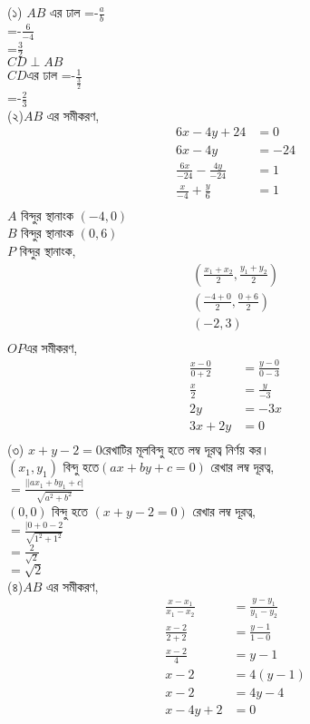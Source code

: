 \documentclass{article}
\begin{document}
	\Large
	(১) $AB$ এর ঢাল =-$\frac{a}{b}$\\
	=-$\frac{6}{-4}$\\
	=$\frac{3}{2}$\\
	$CD \perp AB$\\
	$CD$এর ঢাল =-$\frac{1}{\frac{3}{2}}$\\
	=-$\frac{2}{3}$\\
(২)$AB$ এর সমীকরণ,\\
\begin{align*}
	6x-4y+24&=0\\
	6x-4y&=-24\\
	\frac{6x}{-24}-\frac{4y}{-24}&=1\\
	\frac{x}{-4}+\frac{y}{6}&=1\\
\end{align*}
$A$ বিন্দুর স্থানাংক $(-4,0)$\\
$B$ বিন্দুর স্থানাংক $(0,6)$\\
$P$ বিন্দুর স্থানাংক,
\begin{align*}
	\left(\frac{x_1+x_2}{2},\frac{y_1+y_2}{2}\right)\\
	\left(\frac{-4+0}{2},\frac{0+6}{2}\right)\\
	(-2,3)\\
\end{align*}
$OP$এর সমীকরণ,
\begin{align*}
	\frac{x-0}{0+2}&=\frac{y-0}{0-3}\\
	\frac{x}{2}&=\frac{y}{-3}\\
	2y&=-3x\\
	3x+2y&=0\\
\end{align*}
(৩) $x+y-2=0$রেখাটির মূলবিন্দু হতে লম্ব দূরত্ব নির্ণয় কর।\\
$(x_1,y_1)$ বিন্দু হতে$(ax+by+c=0)$ রেখার লম্ব দূরত্ব,\\
$=\frac{||ax_1+by_1+c|}{\sqrt{a^2+b^2}}$\\
$(0,0)$ বিন্দু হতে $(x+y-2=0)$ রেখার লম্ব দূরত্ব,\\
$=\frac{|0+0-2}{\sqrt{1^2+1^2}}$\\
$=\frac{2}{\sqrt{2}}$\\
$=\sqrt{2}$\\
(৪)$AB$ এর সমীকরণ,\\
\begin{align*}
	\frac{x-x_1}{x_1-x_2}&=\frac{y-y_1}{y_1-y_2}\\
	\frac{x-2}{2+2}&=\frac{y-1}{1-0}\\
	\frac{x-2}{4}&=y-1\\
	x-2&=4(y-1)\\
	x-2&=4y-4\\
	x-4y+2&=0\\
\end{align*}
\end{document}

